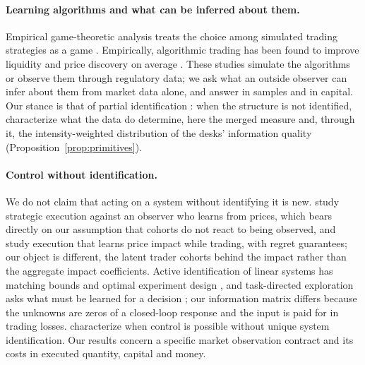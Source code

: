 \documentclass[12pt]{article}
\theoremstyle{definition}
\theoremstyle{remark}
\begin{document}
\paragraph{Learning algorithms and what can be inferred about them.} Empirical game-theoretic analysis treats the choice among simulated trading strategies as a game \citep{wellman2006}. Empirically, algorithmic trading has been found to improve liquidity and price discovery on average \citep{hendershott2011,brogaard2014}. These studies simulate the algorithms or observe them through regulatory data; we ask what an outside observer can infer about them from market data alone, and answer in samples and in capital. Our stance is that of partial identification \citep{manski2003}: when the structure is not identified, characterize what the data do determine, here the merged measure and, through it, the intensity-weighted distribution of the desks' information quality (Proposition~\ref{prop:primitives}).
\paragraph{Control without identification.} We do not claim that acting on a system without identifying it is new. \citet{moallemi2008} study strategic execution against an observer who learns from prices, which bears directly on our assumption that cohorts do not react to being observed, and \citet{parkvanroy2015} study execution that learns price impact while trading, with regret guarantees; our object is different, the latent trader cohorts behind the impact rather than the aggregate impact coefficients. Active identification of linear systems has matching bounds and optimal experiment design \citep{wagenmaker2020}, and task-directed exploration asks what must be learned for a decision \citep{wagenmaker2021}; our information matrix differs because the unknowns are zeros of a closed-loop response and the input is paid for in trading losses. \citet{vanwaarde2020} characterize when control is possible without unique system identification. Our results concern a specific market observation contract and its costs in executed quantity, capital and money.
\end{document}

